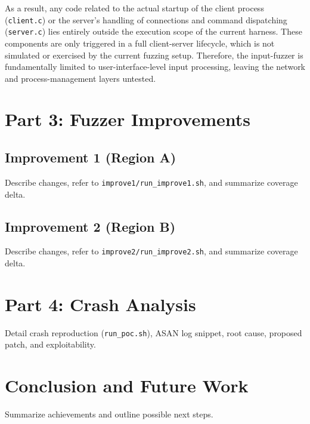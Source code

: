 \documentclass[11pt,a4paper,twocolumn]{article}
\begin{document}
As a result, any code related to the actual startup of the client process (\texttt{client.c}) or the server's handling of connections and command dispatching (\texttt{server.c}) lies entirely outside the execution scope of the current harness. These components are only triggered in a full client-server lifecycle, which is not simulated or exercised by the current fuzzing setup. Therefore, the input-fuzzer is fundamentally limited to user-interface-level input processing, leaving the network and process-management layers untested.

\section{Part 3: Fuzzer Improvements}

\subsection{Improvement 1 (Region A)}
Describe changes, refer to \texttt{improve1/run\_improve1.sh}, and summarize coverage delta.

\subsection{Improvement 2 (Region B)}
Describe changes, refer to \texttt{improve2/run\_improve2.sh}, and summarize coverage delta.

\section{Part 4: Crash Analysis}
Detail crash reproduction (\texttt{run\_poc.sh}), ASAN log snippet, root cause, proposed patch, and exploitability.

\section{Conclusion and Future Work}
Summarize achievements and outline possible next steps.

\printbibliography
\end{document}
